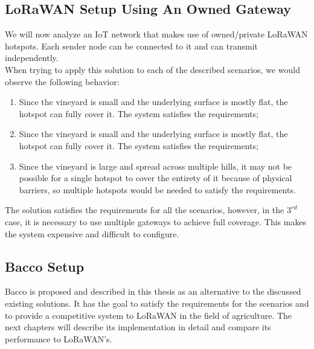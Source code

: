\subsection{LoRaWAN Setup Using An Owned Gateway}
We will now analyze an \gls{IoT} network that makes use of owned/private LoRaWAN hotspots. Each
sender node can be connected to it and can transmit independently.\\
When trying to apply this solution to each of the described scenarios, we would observe the following behavior:
\begin{enumerate}
    \item Since the vineyard is small and the underlying surface is mostly flat, the hotspot can fully cover it. The
        system satisfies the requirements;
    \item Since the vineyard is small and the underlying surface is mostly flat, the hotspot can fully cover it. The
        system satisfies the requirements;
    \item Since the vineyard is large and spread across multiple hills, it may not be possible for a single hotspot to
        cover the entirety of it because of physical barriers, so multiple hotspots would be needed to satisfy the
        requirements.
\end{enumerate}
The solution satisfies the requirements for all the scenarios, however, in the $3^{rd}$ case, it is necessary to use
multiple gateways to achieve full coverage. This makes the system expensive and difficult to configure.

\subsection{Bacco Setup}
Bacco is proposed and described in this thesis as an alternative to the discussed existing solutions. It has the goal to
satisfy the requirements for the scenarios and to provide a competitive system to LoRaWAN in the field of
agriculture. The next chapters will describe its implementation in detail and compare its performance to LoRaWAN's.
